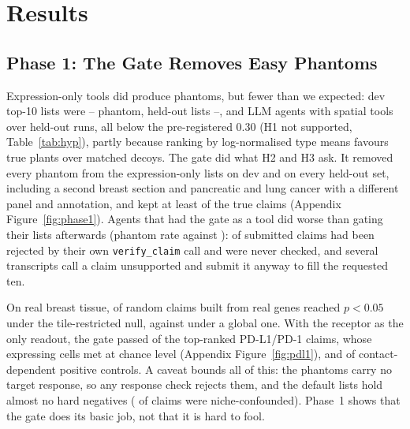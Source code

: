 \documentclass[letterpaper]{article} %
\begin{document}
\section{Results}
\subsection{Phase 1: The Gate Removes Easy Phantoms}
Expression-only tools did produce phantoms, but fewer than we expected: dev top-10 lists were
\devBreastReponeProdKTenPR{}--\devBreastReponeCpdbKTenPR{} phantom, held-out lists
\testPancreasCpdbKTenPR{}--\testBreastReponeCpdbKTenPR{}, and LLM agents with spatial tools \agTestAllBothPR{}
\agTestAllBothPRci{} over \agTestAllBothRuns{} held-out runs, all below the pre-registered 0.30 (H1 not supported,
Table~\ref{tab:hyp}), partly because ranking by log-normalised type means favours true plants over matched decoys.
The gate did what H2 and H3 ask. It removed every phantom from the expression-only lists on dev and on every held-out
set, including a second breast section and pancreatic and lung cancer with a different panel and annotation, and kept
at least \agDevBreastReponeGeminiRet{} of the true claims (Appendix Figure~\ref{fig:phase1}). Agents that had the gate
as a tool did worse than gating their lists afterwards (phantom rate \agTestAllBothToolPR{} \agTestAllBothToolPRci{}
against \agTestAllBothPRafter{}): \compTestVerifiedFailSubmitted{} of \compTestSubmitted{} submitted claims had been
rejected by their own \texttt{verify\_claim} call and \compTestUnverified{} were never checked, and several transcripts
call a claim unsupported and submit it anyway to fill the requested ten.

On real breast tissue, \rnullFrozenFive{} of \rnullN{} random claims built from real genes reached $p<0.05$ under the
tile-restricted null, against \rnullNoTilesFive{} under a global one. With the receptor as the only readout, the gate
passed \realPdlPass{} of the \realPdlN{} top-ranked PD-L1/PD-1 claims, whose expressing cells met at chance level
(Appendix Figure~\ref{fig:pdl1}), and \realPosctlPass{} of \realPosctlN{} contact-dependent positive controls. A
caveat bounds all of this: the phantoms carry no target response, so any response check rejects them, and the default
lists hold almost no hard negatives (\compTenNiche{} of \compTenN{} claims were niche-confounded). Phase~1 shows that
the gate does its basic job, not that it is hard to fool.
\end{document}
